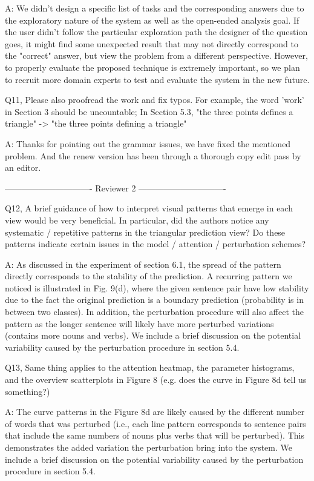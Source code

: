 A: We didn't design a specific list of tasks and the corresponding answers due to the exploratory nature of the system as well as the open-ended analysis goal. If the user didn't follow the particular exploration path the designer of the question goes, it might find some unexpected result that may not directly correspond to the "correct" answer, but view the problem from a different perspective. However, to properly evaluate the proposed technique is extremely important, so we plan to recruit more domain experts to test and evaluate the system in the new future.

Q11, Please also proofread the work and fix typos. For example, the word 'work' in Section 3 should be uncountable; In Section 5.3, "the three points defines a triangle" -> "the three points defining a triangle"

A: Thanks for pointing out the grammar issues, we have fixed the mentioned problem. And the renew version has been through a thorough copy edit pass by an editor.

------------------------------- Reviewer 2 -------------------------------

Q12, A brief guidance of how to interpret visual patterns that emerge in each view would be very beneficial. In particular, did the authors notice any systematic / repetitive patterns in the triangular prediction view? Do these patterns indicate certain issues in the model / attention / perturbation schemes?

A: As discussed in the experiment of section 6.1, the spread of the pattern directly corresponds to the stability of the prediction. A recurring pattern we noticed is illustrated in Fig. 9(d), where the given sentence pair have low stability due to the fact the original prediction is a boundary prediction (probability is in between two classes). In addition, the perturbation procedure will also affect the pattern as the longer sentence will likely have more perturbed variations (contains more nouns and verbs). We include a brief discussion on the potential variability caused by the perturbation procedure in section 5.4.

Q13, Same thing applies to the attention heatmap, the parameter histograms, and the overview scatterplots in Figure 8 (e.g. does the curve in Figure 8d tell us something?)

A: The curve patterns in the Figure 8d are likely caused by the different number of words that was perturbed (i.e., each line pattern corresponds to sentence pairs that include the same numbers of nouns plus verbs that will be perturbed). This demonstrates the added variation the perturbation bring into the system. We include a brief discussion on the potential variability caused by the perturbation procedure in section 5.4.

